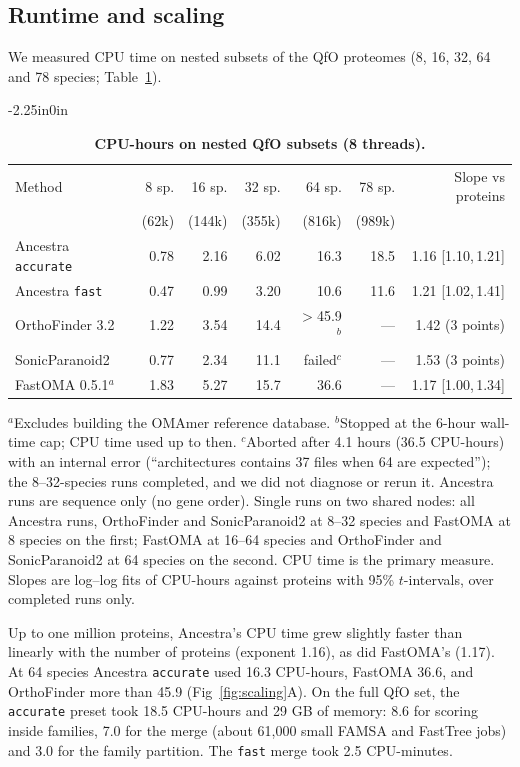 \documentclass[10pt,letterpaper]{article}
\newcommand{\CI}[2]{[#1,\,#2]}
\begin{document}
\subsection*{Runtime and scaling}
We measured CPU time on nested subsets of the QfO proteomes (8, 16, 32, 64 and 78 species; Table~\ref{tab:scaling}).

\begin{table}[!ht]
\begin{adjustwidth}{-2.25in}{0in}
\centering
\caption{{\bf CPU-hours on nested QfO subsets (8 threads).}}
\begin{tabular}{lrrrrrr}
\hline
Method & 8 sp. & 16 sp. & 32 sp. & 64 sp. & 78 sp. & Slope vs proteins\\
 & (62k) & (144k) & (355k) & (816k) & (989k) & \\
\hline
Ancestra \texttt{accurate} & 0.78 & 2.16 & 6.02 & 16.3 & 18.5 & 1.16 \CI{1.10}{1.21}\\
Ancestra \texttt{fast} & 0.47 & 0.99 & 3.20 & 10.6 & 11.6 & 1.21 \CI{1.02}{1.41}\\
OrthoFinder 3.2 & 1.22 & 3.54 & 14.4 & $>$45.9$^b$ & --- & 1.42 (3 points)\\
SonicParanoid2 & 0.77 & 2.34 & 11.1 & failed$^c$ & --- & 1.53 (3 points)\\
FastOMA 0.5.1$^a$ & 1.83 & 5.27 & 15.7 & 36.6 & --- & 1.17 \CI{1.00}{1.34}\\
\hline
\end{tabular}
\begin{flushleft}$^a$Excludes building the OMAmer reference database. $^b$Stopped at the 6-hour wall-time cap; CPU time used up to then. $^c$Aborted after 4.1 hours (36.5 CPU-hours) with an internal error (``architectures contains 37 files when 64 are expected''); the 8--32-species runs completed, and we did not diagnose or rerun it. Ancestra runs are sequence only (no gene order). Single runs on two shared nodes: all Ancestra runs, OrthoFinder and SonicParanoid2 at 8--32 species and FastOMA at 8 species on the first; FastOMA at 16--64 species and OrthoFinder and SonicParanoid2 at 64 species on the second. CPU time is the primary measure. Slopes are log--log fits of CPU-hours against proteins with 95\% $t$-intervals, over completed runs only.
\end{flushleft}
\label{tab:scaling}
\end{adjustwidth}
\end{table}

Up to one million proteins, Ancestra's CPU time grew slightly faster than linearly with the number of proteins (exponent 1.16), as did FastOMA's (1.17). At 64 species Ancestra \texttt{accurate} used 16.3 CPU-hours, FastOMA 36.6, and OrthoFinder more than 45.9 (Fig~\ref{fig:scaling}A). On the full QfO set, the \texttt{accurate} preset took 18.5 CPU-hours and 29 GB of memory: 8.6 for scoring inside families, 7.0 for the merge (about 61,000 small FAMSA and FastTree jobs) and 3.0 for the family partition. The \texttt{fast} merge took 2.5 CPU-minutes.
\end{document}
